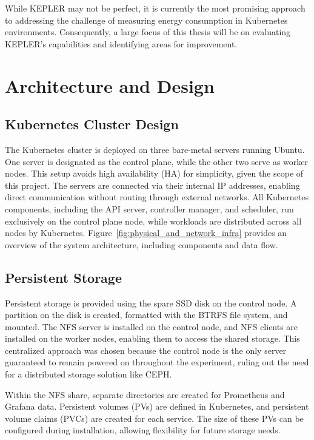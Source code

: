 While KEPLER may not be perfect, it is currently the most promising approach to addressing the challenge of measuring energy consumption in Kubernetes environments. Consequently, a large focus of this thesis will be on evaluating KEPLER's capabilities and identifying areas for improvement.

\section{Architecture and Design}

\subsection{Kubernetes Cluster Design}

The Kubernetes cluster is deployed on three bare-metal servers running Ubuntu. One server is designated as the control plane, while the other two serve as worker nodes. This setup avoids high availability (HA) for simplicity, given the scope of this project. The servers are connected via their internal IP addresses, enabling direct communication without routing through external networks. All Kubernetes components, including the API server, controller manager, and scheduler, run exclusively on the control plane node, while workloads are distributed across all nodes by Kubernetes. Figure~\ref{fig:physical_and_network_infra} provides an overview of the system architecture, including components and data flow.

\subsection{Persistent Storage}

Persistent storage is provided using the spare SSD disk on the control node. A partition on the disk is created, formatted with the BTRFS file system, and mounted. The NFS server is installed on the control node, and NFS clients are installed on the worker nodes, enabling them to access the shared storage. This centralized approach was chosen because the control node is the only server guaranteed to remain powered on throughout the experiment, ruling out the need for a distributed storage solution like CEPH.

Within the NFS share, separate directories are created for Prometheus and Grafana data. Persistent volumes (PVs) are defined in Kubernetes, and persistent volume claims (PVCs) are created for each service. The size of these PVs can be configured during installation, allowing flexibility for future storage needs.

